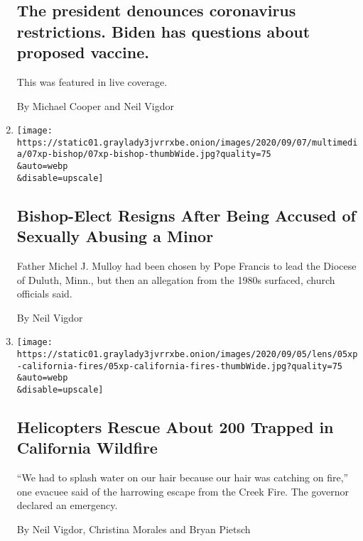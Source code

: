 \begin{enumerate}
  \hypertarget{the-president-denounces-coronavirus-restrictions-biden-has-questions-about-proposed-vaccine}{%
  \subsection{The president denounces coronavirus restrictions. Biden
  has questions about proposed
  vaccine.}\label{the-president-denounces-coronavirus-restrictions-biden-has-questions-about-proposed-vaccine}}

  This was featured in live coverage.

  By Michael Cooper and Neil Vigdor
\item
  \href{/2020/09/07/us/bishop-duluth-minnesota-sexual-abuse.html}{}

  \texttt{[image: https://static01.graylady3jvrrxbe.onion/images/2020/09/07/multimedia/07xp-bishop/07xp-bishop-thumbWide.jpg?quality=75\\\&auto=webp\\\&disable=upscale]}

  \hypertarget{bishop-elect-resigns-after-being-accused-of-sexually-abusing-a-minor}{%
  \subsection{Bishop-Elect Resigns After Being Accused of Sexually
  Abusing a
  Minor}\label{bishop-elect-resigns-after-being-accused-of-sexually-abusing-a-minor}}

  Father Michel J. Mulloy had been chosen by Pope Francis to lead the
  Diocese of Duluth, Minn., but then an allegation from the 1980s
  surfaced, church officials said.

  By Neil Vigdor
\item
  \href{/2020/09/06/us/mammoth-pools-fires-california.html}{}

  \texttt{[image: https://static01.graylady3jvrrxbe.onion/images/2020/09/05/lens/05xp-california-fires/05xp-california-fires-thumbWide.jpg?quality=75\\\&auto=webp\\\&disable=upscale]}

  \hypertarget{helicopters-rescue-about-200-trapped-in-california-wildfire}{%
  \subsection{Helicopters Rescue About 200 Trapped in California
  Wildfire}\label{helicopters-rescue-about-200-trapped-in-california-wildfire}}

  ``We had to splash water on our hair because our hair was catching on
  fire,'' one evacuee said of the harrowing escape from the Creek Fire.
  The governor declared an emergency.

  By Neil Vigdor, Christina Morales and Bryan Pietsch
\end{enumerate}

